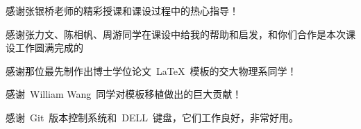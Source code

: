 
\begin{thanks}

  感谢张银桥老师的精彩授课和课设过程中的热心指导！
  
  感谢张力文、陈相帆、周游同学在课设中给我的帮助和启发，和你们合作是本次课设工作圆满完成的

  感谢那位最先制作出博士学位论文~\LaTeX~模板的交大物理系同学！

  感谢~William Wang~同学对模板移植做出的巨大贡献！

  感谢~Git~版本控制系统和~DELL~键盘，它们工作良好，非常好用。
  
\end{thanks}
